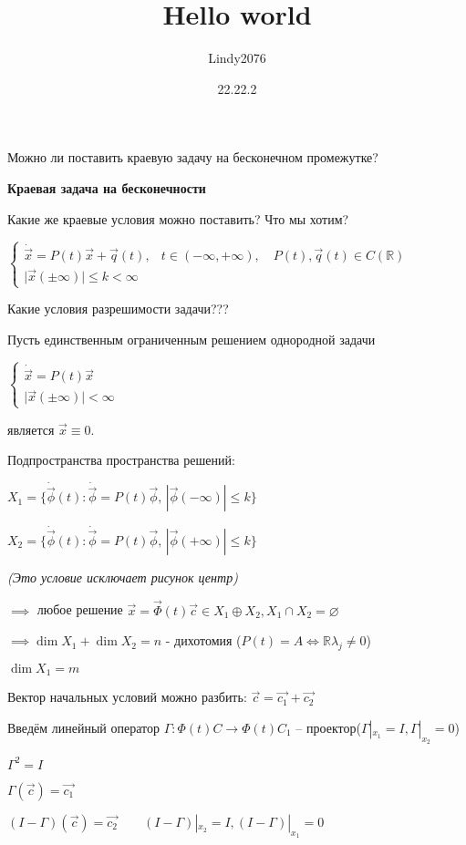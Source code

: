 \documentclass[12pt, a4paper]{article}
\title{Hello world}
\author{Lindy2076}
\date{22.22.2} %
\begin{document}
    Можно ли поставить краевую задачу на бесконечном промежутке?

    \textbf{\large Краевая задача на бесконечности}

    Какие же краевые условия можно поставить? Что мы хотим?

    $\begin{cases}
        \dot{\vec{x}} = P(t)\vec{x} + \vec{q}(t), & t \in (-\infty, +\infty), \quad P(t), \vec{q}(t) \in C(\mathbb{R})\\
        \big| \vec{x}(\pm \infty) \big| \le k < \infty
    \end{cases}$
    
    Какие условия разрешимости задачи???

    Пусть единственным ограниченным решением однородной задачи

    $\begin{cases}
        \dot{\vec{x}} = P(t)\vec{x} \\
        \big| \vec{x}(\pm\infty) \big| < \infty
    \end{cases}$

    является $\vec{x} \equiv 0$.

    Подпространства пространства решений:

    $X_1 = \{ \dot{\vec{\phi}}(t) : \dot{\vec{\phi}}= P(t)\vec{\phi}, \, |\vec{\phi}(-\infty)| \le k \}$

    $X_2 = \{\dot{\vec{\phi}}(t): \dot{\vec{\phi}} = P(t) \vec{\phi}, \, |\vec\phi(+\infty) | \le k\}$
    
    {\small\textit{(Это условие исключает рисунок центр)}}

    $\implies$ любое решение $\vec{x} = \vec{\Phi}(t)\vec{c} \in X_1 \oplus X_2, X_1 \cap X_2 = \varnothing $

    $\implies \dim X_1 + \dim X_2 = n$  - дихотомия \big($P(t) = A \iff \mathbb{R}\lambda_j \neq 0$\big)

    $\dim X_1 = m$
    
    Вектор начальных условий можно разбить: $\vec{c} = \vec{c_1} + \vec{c_2}$

    Введём линейный оператор $\Gamma: \Phi(t)C \to \Phi(t)C_1$ -- проектор($\Gamma|_{x_1} = I, \Gamma|_{x_2} = 0$)

    $\Gamma^2 = I$

    $\Gamma(\vec{c}) = \vec{c_1}$

    $(I - \Gamma)(\vec{c}) = \vec{c_2} \qquad (I - \Gamma)|_{x_2} = I, (I - \Gamma)|_{x_1} = 0$
\end{document}
